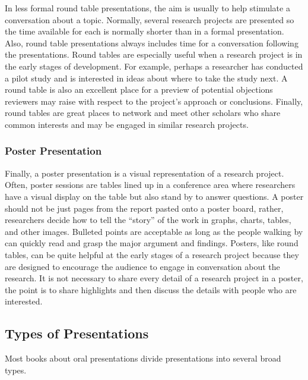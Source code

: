 In less formal round table presentations, the aim is usually to help stimulate a conversation about a topic. Normally, several research projects are presented so the time available for each is normally shorter than in a formal presentation. Also, round table presentations always includes time for a conversation following the presentations. Round tables are especially useful when a research project is in the early stages of development. For example, perhaps a researcher has conducted a pilot study and is interested in ideas about where to take the study next. A round table is also an excellent place for a preview of potential objections reviewers may raise with respect to the project's approach or conclusions. Finally, round tables are great places to network and meet other scholars who share common interests and may be engaged in similar research projects.

\subsubsection{Poster Presentation}

Finally, a poster presentation is a visual representation of a research project. Often, poster sessions are tables lined up in a conference area where researchers have a visual display on the table but also stand by to answer questions. A poster should not be just pages from the report pasted onto a poster board, rather, researchers decide how to tell the ``story'' of the work in graphs, charts, tables, and other images. Bulleted points are acceptable as long as the people walking by can quickly read and grasp the major argument and findings. Posters, like round tables, can be quite helpful at the early stages of a research project because they are designed to encourage the audience to engage in conversation about the research. It is not necessary to share every detail of a research project in a poster, the point is to share highlights and then discuss the details with people who are interested.

\subsection{Types of Presentations}

Most books about oral presentations divide presentations into several broad types.

